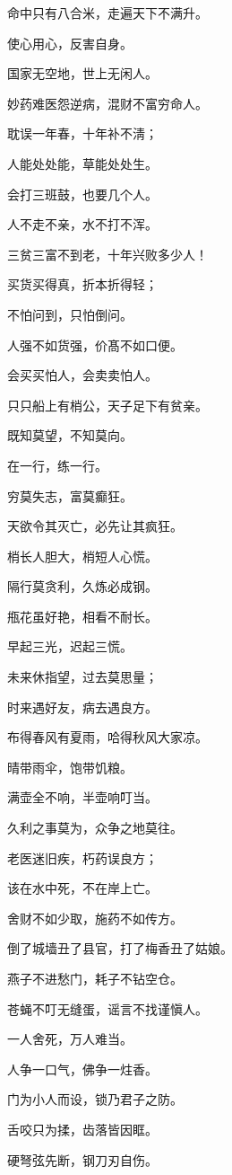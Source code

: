 \documentclass[12pt,oneside]{book}
\begin{document}
命中只有八合米，走遍天下不满升。

使心用心，反害自身。

国家无空地，世上无闲人。

妙药难医怨逆病，混财不富穷命人。

耽误一年春，十年补不淸；

人能处处能，草能处处生。

会打三班鼓，也要几个人。

人不走不亲，水不打不浑。

三贫三富不到老，十年兴败多少人！

买货买得真，折本折得轻；

不怕问到，只怕倒问。

人强不如货强，价髙不如口便。

会买买怕人，会卖卖怕人。

只只船上有梢公，天子足下有贫亲。

既知莫望，不知莫向。

在一行，练一行。

穷莫失志，富莫癫狂。

天欲令其灭亡，必先让其疯狂。

梢长人胆大，梢短人心慌。

隔行莫贪利，久炼必成钢。

甁花虽好艳，相看不耐长。

早起三光，迟起三慌。

未来休指望，过去莫思量；

时来遇好友，病去遇良方。

布得春风有夏雨，哈得秋风大家凉。

晴带雨伞，饱带饥粮。

满壶全不响，半壶响叮当。

久利之事莫为，众争之地莫往。

老医迷旧疾，朽药误良方；

该在水中死，不在岸上亡。

舍财不如少取，施药不如传方。

倒了城墙丑了县官，打了梅香丑了姑娘。

燕子不进愁门，耗子不钻空仓。

苍蝇不叮无缝蛋，谣言不找谨愼人。

一人舍死，万人难当。

人争一口气，佛争一炷香。

门为小人而设，锁乃君子之防。

舌咬只为揉，齿落皆因眶。

硬弩弦先断，钢刀刃自伤。
\end{document}
